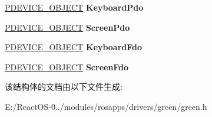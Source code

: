 \begin{DoxyCompactItemize}
\hyperlink{struct___d_e_v_i_c_e___o_b_j_e_c_t}{P\+D\+E\+V\+I\+C\+E\+\_\+\+O\+B\+J\+E\+CT} {\bfseries Keyboard\+Pdo}
\item 
\mbox{\label{struct___g_r_e_e_n___d_e_v_i_c_e___e_x_t_e_n_s_i_o_n_ae4ab64ba9e48452b93e6c309bfd2082c}} 
\hyperlink{struct___d_e_v_i_c_e___o_b_j_e_c_t}{P\+D\+E\+V\+I\+C\+E\+\_\+\+O\+B\+J\+E\+CT} {\bfseries Screen\+Pdo}
\item 
\mbox{\label{struct___g_r_e_e_n___d_e_v_i_c_e___e_x_t_e_n_s_i_o_n_af610c84de0b7d617b328b059a9d1ec38}} 
\hyperlink{struct___d_e_v_i_c_e___o_b_j_e_c_t}{P\+D\+E\+V\+I\+C\+E\+\_\+\+O\+B\+J\+E\+CT} {\bfseries Keyboard\+Fdo}
\item 
\mbox{\label{struct___g_r_e_e_n___d_e_v_i_c_e___e_x_t_e_n_s_i_o_n_acc83e40bd9cc79db654416eb7e908423}} 
\hyperlink{struct___d_e_v_i_c_e___o_b_j_e_c_t}{P\+D\+E\+V\+I\+C\+E\+\_\+\+O\+B\+J\+E\+CT} {\bfseries Screen\+Fdo}
\end{DoxyCompactItemize}


该结构体的文档由以下文件生成\+:\begin{DoxyCompactItemize}
\item 
E\+:/\+React\+O\+S-\/0../modules/rosapps/drivers/green/green.\+h\end{DoxyCompactItemize}
